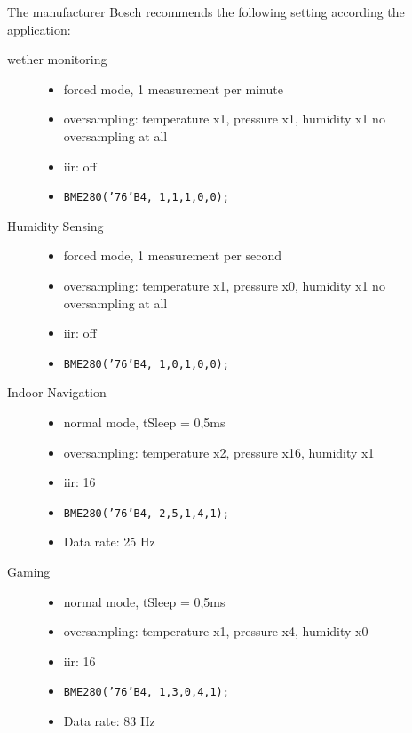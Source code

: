 The manufacturer Bosch recommends the following setting according 
the application:
\begin{description}
\item[wether monitoring]
   \begin{itemize}
   \item forced mode, 1 measurement per minute
   \item oversampling: temperature x1, pressure x1, humidity x1 \newline
     no oversampling at all
   \item iir: off
   \item \texttt{BME280('76'B4, 1,1,1,0,0);}
   \end{itemize}
\item[Humidity Sensing]
   \begin{itemize}
   \item forced mode, 1 measurement per second
   \item oversampling: temperature x1, pressure x0, humidity x1 \newline
     no oversampling at all
   \item iir: off
   \item \texttt{BME280('76'B4, 1,0,1,0,0);}
   \end{itemize}
\item[Indoor Navigation]
   \begin{itemize}
   \item normal mode, tSleep = 0,5ms
   \item oversampling: temperature x2, pressure x16, humidity x1
   \item iir: 16
   \item \texttt{BME280('76'B4, 2,5,1,4,1);}
   \item Data rate: 25 Hz
   \end{itemize}
\item[Gaming]
   \begin{itemize}
   \item normal mode, tSleep = 0,5ms
   \item oversampling: temperature x1, pressure x4, humidity x0
   \item iir: 16
   \item \texttt{BME280('76'B4, 1,3,0,4,1);}
   \item Data rate: 83 Hz
   \end{itemize}

\end{description}


